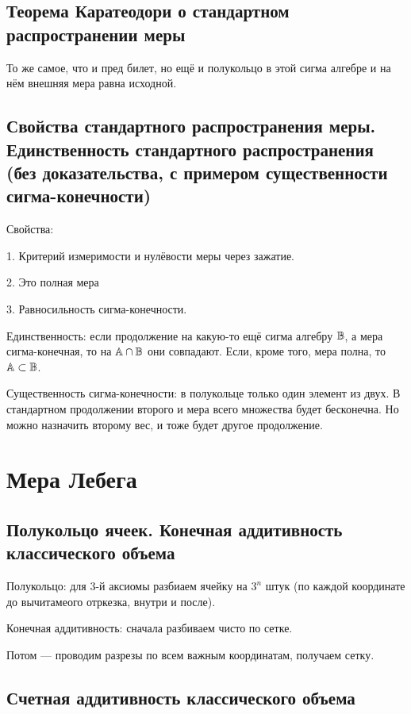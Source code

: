 \documentclass[12pt, a4paper, oneside]{memoir}
\begin{document}
\subsection{Теорема Каратеодори о стандартном распространении меры}

То же самое, что и пред билет, но ещё и полукольцо в этой сигма алгебре и на нём внешняя мера равна исходной.

\subsection{Свойства стандартного распространения меры. 
Единственность стандартного распространения 
(без доказательства, с примером существенности сигма-конечности)}

Свойства: 

1. Критерий измеримости и нулёвости меры через зажатие.

2. Это полная мера

3. Равносильность сигма-конечности.

Единственность: если продолжение на какую-то ещё сигма алгебру ${\mathbb{B}}$,
а мера сигма-конечная, то на ${\mathbb{A}} \cap {\mathbb{B}}$ они совпадают.
Если, кроме того, мера полна, то ${\mathbb{A}} \subset {\mathbb{B}}$.


Существенность сигма-конечности:
в полукольце только один элемент из двух.
В стандартном продолжении второго и мера всего множества будет бесконечна.
Но можно назначить второму вес, и тоже будет другое продолжение.


\section{Мера Лебега}

\subsection{Полукольцо ячеек. Конечная аддитивность классического объема}

Полукольцо: для 3-й аксиомы разбиаем ячейку на $3^n$ штук (по каждой координате до вычитамеого отркезка, внутри и после).

Конечная аддитивность: сначала разбиваем чисто по сетке.

Потом — проводим разрезы по всем важным координатам, получаем сетку.


\subsection{Счетная аддитивность классического объема}
\end{document}
